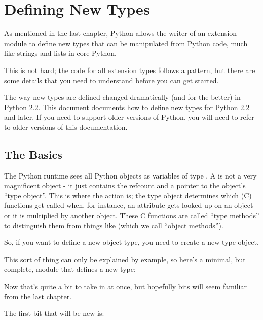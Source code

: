 \chapter{Defining New Types
        \label{defining-new-types}}

As mentioned in the last chapter, Python allows the writer of an
extension module to define new types that can be manipulated from
Python code, much like strings and lists in core Python.

This is not hard; the code for all extension types follows a pattern,
but there are some details that you need to understand before you can
get started.

\begin{notice}
The way new types are defined changed dramatically (and for the
better) in Python 2.2.  This document documents how to define new
types for Python 2.2 and later.  If you need to support older
versions of Python, you will need to refer to older versions of this
documentation.
\end{notice}

\section{The Basics
    \label{dnt-basics}}

The Python runtime sees all Python objects as variables of type
.  A  is not a very magnificent
object - it just contains the refcount and a pointer to the object's
``type object''.  This is where the action is; the type object
determines which (C) functions get called when, for instance, an
attribute gets looked up on an object or it is multiplied by another
object.  These C functions are called ``type methods'' to distinguish
them from things like  (which we call ``object
methods'').

So, if you want to define a new object type, you need to create a new
type object.

This sort of thing can only be explained by example, so here's a
minimal, but complete, module that defines a new type:



Now that's quite a bit to take in at once, but hopefully bits will
seem familiar from the last chapter.

The first bit that will be new is:

